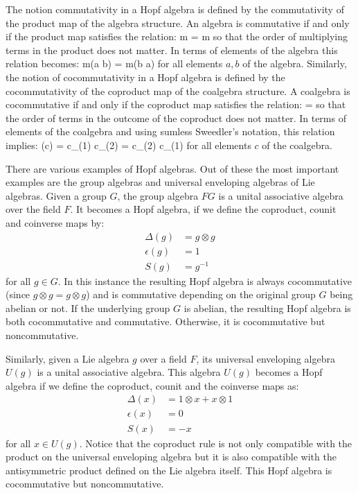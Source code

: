 The notion commutativity in a Hopf algebra is defined by the commutativity of the product
map of the algebra structure. An algebra is commutative if and only if the product map
satisfies the relation:
\beq
m = m \circ \tau
\eeq
so that the order of multiplying terms in the product does not matter. In terms of
elements of the algebra this relation becomes:
\beq
m(a \otimes b) = m(b \otimes a)
\eeq
for all elements $a,b$ of the algebra. Similarly, the
notion of cocommutativity in a Hopf algebra is defined by the cocommutativity of the
coproduct map of the coalgebra structure. A coalgebra is cocommutative if and only if
the coproduct map satisfies the relation:
\beq
\Delta = \tau \circ \Delta
\eeq
so that the order of terms in the outcome of the coproduct does not matter. In
terms of elements of the coalgebra and using sumless Sweedler's notation, this
relation implies:
\beq
\Delta(c) = c_{(1)} \otimes c_{(2)} = c_{(2)} \otimes c_{(1)}
\eeq
for all elements $c$ of the coalgebra.

There are various examples of Hopf algebras. Out of these the most important examples
are the group algebras and universal enveloping algebras of Lie algebras. Given a
group $G$, the group algebra $FG$ is a unital associative algebra over the field $F$.
It becomes a Hopf algebra, if we define the coproduct, counit and coinverse maps by:
\begin{align}
\Delta(g) & = g \otimes g \\
\epsilon(g) & = 1 \\
S(g) & = g^{-1}
\end{align}
for all $g \in G$. In this instance the resulting Hopf algebra is always 
cocommutative  (since $g \otimes g = g \otimes g$) and is
commutative depending on the original group $G$ being abelian or not. If the
underlying group $G$ is abelian, the resulting Hopf algebra is both cocommutative
and commutative. Otherwise, it is cocommutative but noncommutative.

Similarly, given a Lie algebra $g$ over a field $F$, its universal enveloping algebra
$U(g)$ is a unital associative algebra. This algebra $U(g)$ becomes a Hopf algebra
if we define the coproduct, counit and the coinverse maps as:
\begin{align}
\Delta(x) & = 1 \otimes x + x \otimes 1 \\
\epsilon(x) & = 0 \\
S(x) & = -x
\end{align}
for all $x \in U(g)$. Notice that the coproduct rule is not only compatible with the
product on the universal enveloping algebra but it is also compatible with the
antisymmetric product defined on the Lie algebra itself. This Hopf algebra is
cocommutative but noncommutative.

